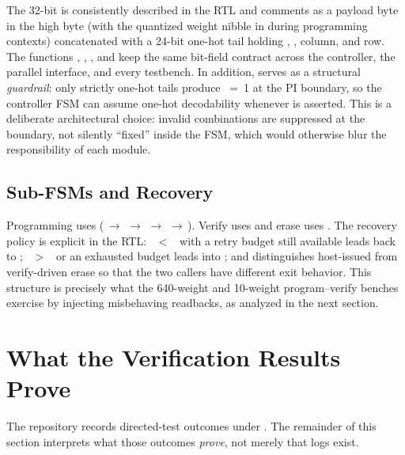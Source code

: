 The 32-bit  is consistently described in the
RTL and comments as a payload byte in the high byte (with the
quantized weight nibble in \sv{[27:24]} during programming contexts)
concatenated with a 24-bit one-hot tail holding , ,
column, and row. The functions ,
, , and
 keep the same bit-field contract across the
controller, the parallel interface, and every testbench. In addition,
 serves as a structural \emph{guardrail}:
only strictly one-hot tails produce ~=~1 at the PI
boundary, so the controller FSM can assume one-hot decodability whenever
 is asserted. This is a deliberate architectural choice:
invalid combinations are suppressed at the boundary, not silently
``fixed'' inside the FSM, which would otherwise blur the responsibility
of each module.

\subsection{Sub-FSMs and Recovery}
\label{sec:analysis-subfsms}

Programming uses 
(\,\(\rightarrow\)\,\,\(\rightarrow\)\,\,\(\rightarrow\)\,\,\(\rightarrow\)\,).
Verify uses  and erase uses .
The recovery policy is explicit in the RTL:
~\(<\)~ with a
retry budget still available leads back to ;
~\(>\)~ or an
exhausted budget leads into ; and
 distinguishes host-issued 
from verify-driven erase so that the two callers have different exit
behavior. This structure is precisely what the 640-weight and 10-weight
program--verify benches exercise by injecting misbehaving readbacks, as
analyzed in the next section.

\section{What the Verification Results Prove}
\label{sec:analysis-proves}

The repository records directed-test outcomes under . The
remainder of this section interprets what those outcomes \emph{prove},
not merely that logs exist.

